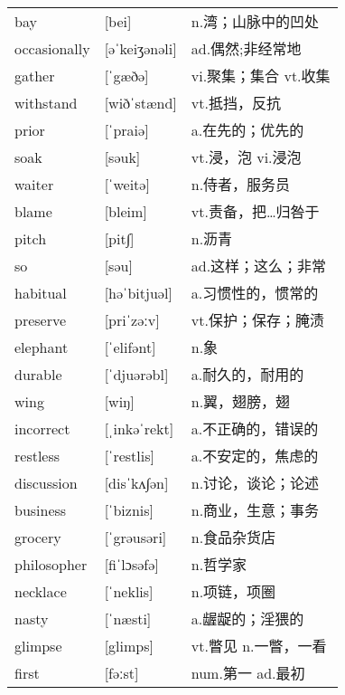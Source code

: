 \documentclass[a4paper]{article}
\begin{document}
\section{}
\begin{tabular}{l l l}

bay & [bei] & n.湾；山脉中的凹处 \\
occasionally & [əˈkeiʒənəli] & ad.偶然;非经常地 \\
gather & [ˈgæðə] & vi.聚集；集合 vt.收集 \\
withstand & [wiðˈstænd] & vt.抵挡，反抗 \\
prior & [ˈpraiə] & a.在先的；优先的 \\
soak & [səuk] & vt.浸，泡 vi.浸泡 \\
waiter & [ˈweitə] & n.侍者，服务员 \\
blame & [bleim] & vt.责备，把…归咎于 \\
pitch & [pit∫] & n.沥青 \\
so & [səu] & ad.这样；这么；非常 \\
habitual & [həˈbitjuəl] & a.习惯性的，惯常的 \\
preserve & [priˈzəːv] & vt.保护；保存；腌渍 \\
elephant & [ˈelifənt] & n.象 \\
durable & [ˈdjuərəbl] & a.耐久的，耐用的 \\
wing & [wiŋ] & n.翼，翅膀，翅 \\
incorrect & [ˌinkəˈrekt] & a.不正确的，错误的 \\
restless & [ˈrestlis] & a.不安定的，焦虑的 \\
discussion & [disˈkʌ∫ən] & n.讨论，谈论；论述 \\
business & [ˈbiznis] & n.商业，生意；事务 \\
grocery & [ˈgrəusəri] & n.食品杂货店 \\
philosopher & [fiˈlɔsəfə] & n.哲学家 \\
necklace & [ˈneklis] & n.项链，项圈 \\
nasty & [ˈnæsti] & a.龌龊的；淫猥的 \\
glimpse & [glimps] & vt.瞥见 n.一瞥，一看 \\
first & [fəːst] & num.第一 ad.最初 \\

\end{tabular}
\end{document}
